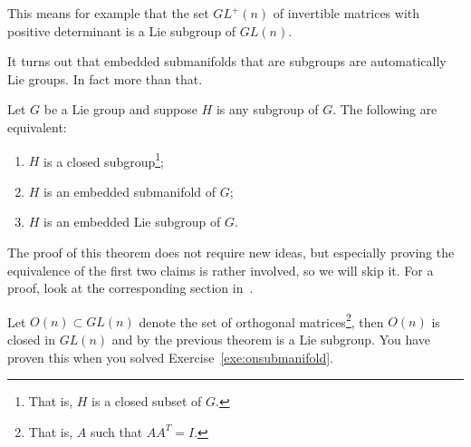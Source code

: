 \begin{example}
	This means for example that the set $GL^+(n)$ of invertible matrices with positive determinant is a Lie subgroup of $GL(n)$.
\end{example}

It turns out that embedded submanifolds that are subgroups are automatically Lie groups. In fact more than that.

\begin{theorem}
	Let $G$ be a Lie group and suppose $H$ is any subgroup of $G$.
	The following are equivalent:
	\begin{enumerate}
		\item $H$ is a closed subgroup\footnote{That is, $H$ is a closed subset of $G$.};
		\item $H$ is an embedded submanifold of $G$;
		\item $H$ is an embedded Lie subgroup of $G$.
	\end{enumerate}
\end{theorem}

The proof of this theorem does not require new ideas, but especially proving the equivalence of the first two claims is rather involved, so we will skip it.
For a proof, look at the corresponding section in~\cite[Chapter 20]{book:lee}.

\begin{example}
	Let $O(n)\subset GL(n)$ denote the set of orthogonal matrices\footnote{That is, $A$ such that $AA^T = I$.}, then $O(n)$ is closed in $GL(n)$ and by the previous theorem is a Lie subgroup.
	You have proven this when you solved Exercise~\ref{exe:onsubmanifold}.
\end{example}

